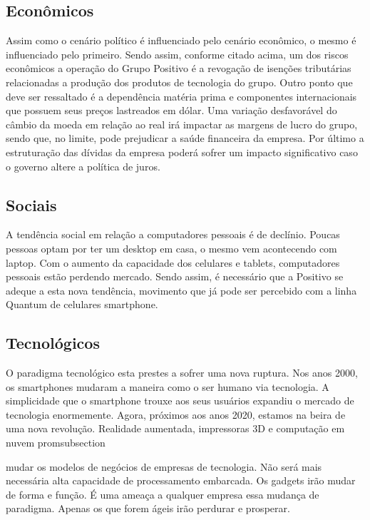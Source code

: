 {{{\subsection{Econômicos}

Assim como o cenário político é influenciado pelo cenário econômico, o mesmo é influenciado pelo primeiro. Sendo assim, conforme citado acima, um dos riscos econômicos a operação do Grupo Positivo é a revogação de isenções tributárias relacionadas a produção dos produtos de tecnologia do grupo. Outro ponto que deve ser ressaltado é a dependência matéria prima e componentes internacionais que possuem seus preços lastreados em dólar. Uma variação desfavorável do câmbio da moeda em relação ao real irá impactar as margens de lucro do grupo, sendo que, no limite, pode prejudicar a saúde financeira da empresa. Por último a estruturação das dívidas da empresa poderá sofrer um impacto significativo caso o governo altere a política de juros.

\subsection{Sociais}
A tendência social em relação a computadores pessoais é de declínio. Poucas pessoas optam por ter um desktop em casa, o mesmo vem acontecendo com laptop. Com o aumento da capacidade dos celulares e tablets, computadores pessoais estão perdendo mercado. Sendo assim, é necessário que a Positivo se adeque a esta nova tendência, movimento que já pode ser percebido com a linha Quantum de celulares smartphone.

\subsection{Tecnológicos}
O paradigma tecnológico esta prestes a sofrer uma nova ruptura. Nos anos 2000, os smartphones mudaram a maneira como o ser humano via tecnologia. A simplicidade que o smartphone trouxe aos seus usuários expandiu o mercado de tecnologia enormemente. Agora, próximos aos anos 2020, estamos na beira de uma nova revolução. Realidade aumentada, impressoras 3D e computação em nuvem promsubsection{ mudar os modelos de negócios de empresas de tecnologia. Não será mais necessária alta capacidade de processamento embarcada. Os gadgets irão mudar de forma e função. É uma ameaça a qualquer empresa essa mudança de paradigma. Apenas os que forem ágeis irão perdurar e prosperar.

}}}}
